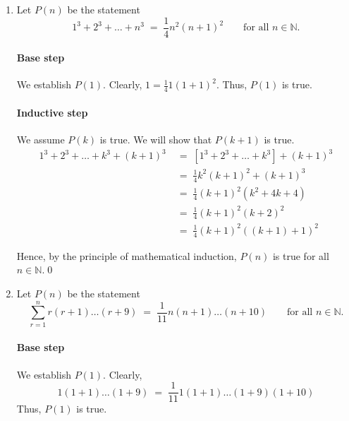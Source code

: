 \documentclass[10pt]{article}
\begin{document}
\begin{enumerate}
                Hence, by the principle of mathematical induction, $P(n)$ is true for all $n \in \mathbb{N}$.\qed\\

                \item Let $P(n)$ be the statement
                \[1^3 + 2^3 + \dots + n^3 \;=\; \frac{1}{4}n^2(n + 1)^2 \quad\quad\text{for all }n \in \mathbb{N}.\]
                \paragraph{Base step}
                We establish $P(1)$. Clearly, $1 = \frac{1}{4}1(1 + 1)^2$. Thus, $P(1)$ is true.
                \paragraph{Inductive step}
                We assume $P(k)$ is true. We will show that $P(k + 1)$ is true.
                \begin{align*}
                        1^3 + 2^3 + \dots + k^3 + (k + 1)^3
                                \;&=\; [1^3 + 2^3 + \dots + k^3] + (k + 1)^3 \\
                                \;&=\; \frac{1}{4}k^2(k + 1)^2 + (k + 1)^3 \tag{From $P(k)$}\\
                                \;&=\; \frac{1}{4}(k + 1)^2(k^2 + 4k + 4)\\
                                \;&=\; \frac{1}{4}(k + 1)^2(k + 2)^2\\
                                \;&=\; \frac{1}{4}(k + 1)^2((k + 1) + 1)^2
                \end{align*}

                Hence, by the principle of mathematical induction, $P(n)$ is true for all $n \in \mathbb{N}$.\qed\\
                
                \item Let $P(n)$ be the statement
                \[\sum_{r = 1}^n r(r + 1)\dots(r + 9) \;=\; \frac{1}{11}n(n + 1)\dots(n + 10) \quad\quad\text{for all }n \in \mathbb{N}.\]
                \paragraph{Base step}
                We establish $P(1)$. Clearly, 
                \[1(1 + 1)\dots(1 + 9) \;=\; \frac{1}{11}1(1 + 1)\dots(1 + 9)(1 + 10)\]
                Thus, $P(1)$ is true.

\end{enumerate}
\end{document}
